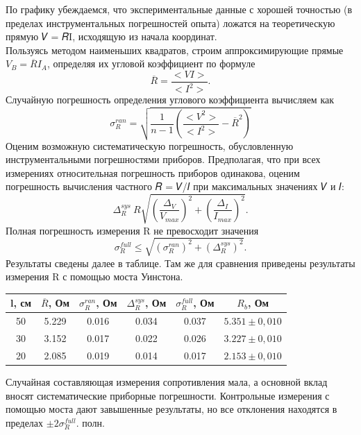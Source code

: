 \documentclass[12pt, a4paper]{article}
\begin{document}
    По графику убеждаемся, что экспериментальные данные с хорошей точностью (в пределах
    инструментальных погрешностей опыта) ложатся на теоретическую прямую 𝑉 = 𝑅I, исходящую из начала координат. \\
    Пользуясь методом наименьших квадратов, строим аппроксимирующие прямые $V_B = \overline{R}I_A$, определяя их угловой коэффициент по формуле 
    \begin{equation}
        \overline{R} = \frac{<VI>}{<I^2>}.
    \end{equation}                                                                                                                                                    
    Случайную погрешность определения углового коэффициента вычисляем как
    \begin{displaymath}
        \sigma_{R}^{ran} = \sqrt{\frac{1}{n-1} (\frac{<V^2>}{<I^2>} - \overline{R}^2)}
    \end{displaymath}
    Оценим возможную систематическую погрешность, обусловленную инструментальными
погрешностями приборов. Предполагая, что при всех измерениях относительная погрешность
приборов одинакова, оценим погрешность вычисления частного 𝑅 = 𝑉/𝐼 при максимальных
значениях 𝑉 и 𝐼:
    \begin{displaymath}
        \Delta_{R}^{sys} ~ R \sqrt{(\frac{\Delta_V}{V_{max}})^2 + (\frac{\Delta_I}{I_{max}})^2}.
    \end{displaymath}
    Полная погрешность измерения R не превосходит значения
    \begin{displaymath}
        \sigma_{R}^{full} \leq \sqrt{(\sigma_{R}^{ran})^2 + (\Delta_{R}^{sys})^2}.
    \end{displaymath}
    Результаты сведены далее в таблице. Там же для сравнения приведены результаты измерения R с помощью моста Уинстона.
    \begin{center}
        \begin{tabular}{ |c|c|c|c|c|c| } \hline
            l, см & $\overline{R}$, Ом & $\sigma_{R}^{ran}$, Ом & $\Delta_{R}^{sys}$, Ом & $\sigma_{R}^{full}$, Ом & $R_b$, Ом \\ \hline
            50 & 5.229 & 0.016 & 0.034 & 0.037 & $5.351 \pm 0,010$ \\ \hline
            30 & 3.152 & 0.017 & 0.022 & 0.026 & $3.227 \pm 0,010$ \\ \hline
            20 & 2.085 & 0.019 & 0.014 & 0.017 & $2.153 \pm 0,010$ \\ \hline
        \end{tabular}
        \end{center} 
Случайная составляющая измерения сопротивления мала, а основной вклад вносят систематические приборные погрешности. Контрольные измерения с помощью моста дают
завышенные результаты, но все отклонения находятся в пределах $\pm 2\sigma_{R}^{full}$.
полн. \\
\end{document}
